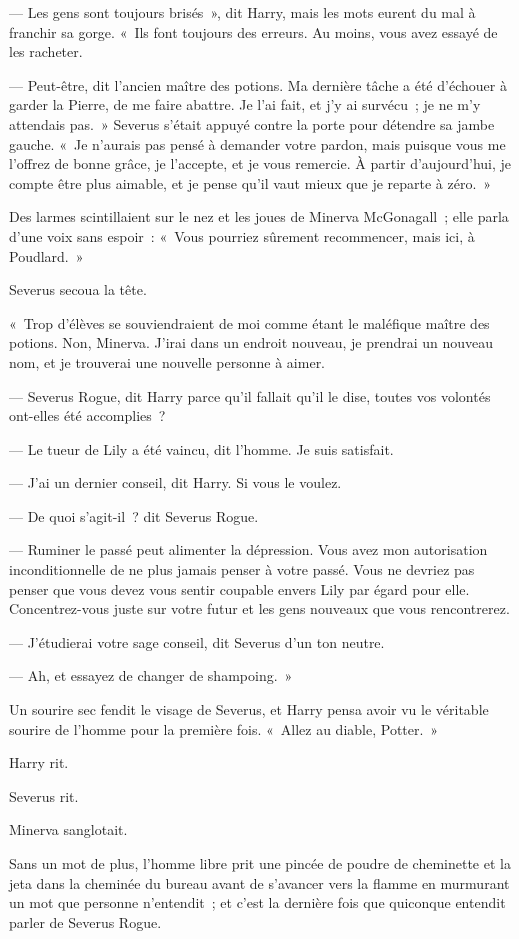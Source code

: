 --- Les gens sont toujours brisés~», dit Harry, mais les mots eurent du mal à franchir sa gorge. «~Ils font toujours des erreurs. Au moins, vous avez essayé de les racheter.

--- Peut-être, dit l'ancien maître des potions. Ma dernière tâche a été d'échouer à garder la Pierre, de me faire abattre. Je l'ai fait, et j'y ai survécu~; je ne m'y attendais pas.~» Severus s'était appuyé contre la porte pour détendre sa jambe gauche. «~Je n'aurais pas pensé à demander votre pardon, mais puisque vous me l'offrez de bonne grâce, je l'accepte, et je vous remercie. À partir d'aujourd'hui, je compte être plus aimable, et je pense qu'il vaut mieux que je reparte à zéro.~»

Des larmes scintillaient sur le nez et les joues de Minerva McGonagall~; elle parla d'une voix sans espoir~: «~Vous pourriez sûrement recommencer, mais ici, à Poudlard.~»

Severus secoua la tête.

«~Trop d'élèves se souviendraient de moi comme étant le maléfique maître des potions. Non, Minerva. J'irai dans un endroit nouveau, je prendrai un nouveau nom, et je trouverai une nouvelle personne à aimer.

--- Severus Rogue, dit Harry parce qu'il fallait qu'il le dise, toutes vos volontés ont-elles été accomplies~?

--- Le tueur de Lily a été vaincu, dit l'homme. Je suis satisfait.

--- J'ai un dernier conseil, dit Harry. Si vous le voulez.

--- De quoi s'agit-il~? dit Severus Rogue.

--- Ruminer le passé peut alimenter la dépression. Vous avez mon autorisation inconditionnelle de ne plus jamais penser à votre passé. Vous ne devriez pas penser que vous devez vous sentir coupable envers Lily par égard pour elle. Concentrez-vous juste sur votre futur et les gens nouveaux que vous rencontrerez.

--- J'étudierai votre sage conseil, dit Severus d'un ton neutre.

--- Ah, et essayez de changer de shampoing.~»

Un sourire sec fendit le visage de Severus, et Harry pensa avoir vu le véritable sourire de l'homme pour la première fois. «~Allez au diable, Potter.~»

Harry rit.

Severus rit.

Minerva sanglotait.

Sans un mot de plus, l'homme libre prit une pincée de poudre de cheminette et la jeta dans la cheminée du bureau avant de s'avancer vers la flamme en murmurant un mot que personne n'entendit~; et c'est la dernière fois que quiconque entendit parler de Severus Rogue.
